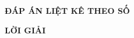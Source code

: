 \documentclass[11pt]{article}
\begin{document}
\vspace*{1cm}
\lamtieude
\indapanso
\begin{center}
{\bf ĐÁP ÁN LIỆT KÊ THEO SỐ}
\end{center}
\begin{center}
\chucauhoi{ }
\begin{multicols}{10}
\begin{enumerate}[\causo]
\foreachproblem[bttracnghiem]{\item\thisproblem}
\end{enumerate}
\end{multicols}
\end{center}




\newpage
\setcounter{page}{1}
%
\lamtieude
\inloigiai
\begin{center}
{\bf LỜI GIẢI}
\end{center}
\begin{enumerate}[]
\foreachproblem[bttracnghiem]{\item\thisproblem}
\end{enumerate}
\label{lgPage}




\newpage
\lamphieuthi
 \inphieuthi
\begin{multicols}{3}
\begin{enumerate}[\causo]
 \foreachproblem[bttracnghiem]{\item\thisproblem}
\end{enumerate}
\end{multicols}


\end{document}

